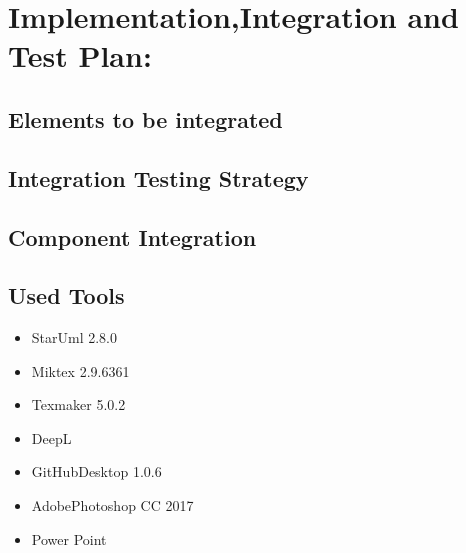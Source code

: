 \documentclass [12pt]{article}
\begin{document}
\section{Implementation,Integration and Test Plan:}
\subsection{Elements to be integrated}

\subsection{Integration Testing Strategy}

\subsection{Component Integration}

\subsection{Used Tools}
\begin{itemize}
\item StarUml 2.8.0
\item Miktex 2.9.6361
\item Texmaker 5.0.2
\item DeepL
\item GitHubDesktop 1.0.6
\item AdobePhotoshop CC 2017
\item Power Point
\end{itemize}
\end{document}
